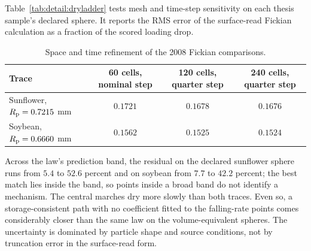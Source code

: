 Table~\ref{tab:detail:dryladder} tests mesh and time-step sensitivity
on each thesis sample's declared sphere. It reports the RMS error of the
surface-read Fickian calculation as a fraction of the scored loading drop.

\begin{table}[htbp]\centering\footnotesize
\caption{Space and time refinement of the 2008 Fickian comparisons.}
\label{tab:detail:dryladder}\label{tab:evidence:dryladder}
\begin{tabular}{@{}lccc@{}}\toprule
Trace & 60 cells, nominal step & 120 cells, quarter step & 240 cells, quarter step\\\midrule
Sunflower, $R_{\mathrm{p}}=0.7215$ mm & $0.1721$ & $0.1678$ & $0.1676$\\
Soybean, $R_{\mathrm{p}}=0.6660$ mm & $0.1562$ & $0.1525$ & $0.1524$\\
\bottomrule\end{tabular}\end{table}

Across the law's prediction band, the residual on the declared sunflower sphere runs from $5.4$ to $52.6$ percent and on soybean from $7.7$ to $42.2$ percent; the best match lies inside the band, so points inside a broad band do not identify a mechanism. The central marches dry more slowly than both traces. Even so, a storage-consistent path with no coefficient fitted to the falling-rate points comes considerably closer than the same law on the volume-equivalent spheres. The uncertainty is dominated by particle shape and source conditions, not by truncation error in the surface-read form.
